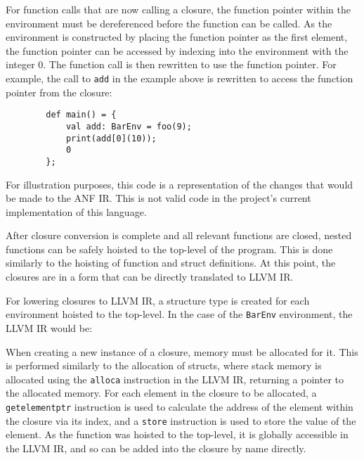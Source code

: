 For function calls that are now calling a closure, the function pointer within the environment must
be dereferenced before the function can be called. As the environment is constructed by placing the
function pointer as the first element, the function pointer can be accessed by indexing into the
environment with the integer 0. The function call is then rewritten to use the function pointer.
For example, the call to \texttt{add} in the example above is rewritten to access the function
pointer from the closure:

\begin{tcolorbox}
    \begin{verbatim}
        def main() = {
            val add: BarEnv = foo(9);
            print(add[0](10));
            0
        };
    \end{verbatim}
    \tcblower
    \footnotesize
    For illustration purposes, this code is a representation of the changes that would be made
    to the ANF IR. This is not valid code in the project's current implementation of this language.
\end{tcolorbox}

After closure conversion is complete and all relevant functions are closed, nested functions can be
safely hoisted to the top-level of the program. This is done similarly to the hoisting of
function and struct definitions. At this point, the closures are in a form that can be directly
translated to LLVM IR.

For lowering closures to LLVM IR, a structure type is created for each environment hoisted to the
top-level. In the case of the \texttt{BarEnv} environment, the LLVM IR would be:


When creating a new instance of a closure, memory must be allocated for it. This is performed
similarly to the allocation of structs, where stack memory is allocated using the \texttt{alloca}
instruction in the LLVM IR, returning a pointer to the allocated memory. For each element in the
closure to be allocated, a \texttt{getelementptr} instruction is used to calculate the address of
the element within the closure via its index, and a \texttt{store} instruction is used to store the
value of the element. As the function was hoisted to the top-level, it is globally accessible in the
LLVM IR, and so can be added into the closure by name directly.

